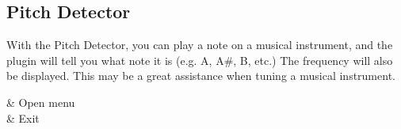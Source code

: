 
\subsection{Pitch Detector}

With the Pitch Detector, you can play a note on a musical instrument,
and the plugin will tell you what note it is (e.g. A, A\#, B, etc.) The
frequency will also be displayed. This may be a great assistance when
tuning a musical instrument.

\begin{btnmap}
    \PluginCancel
    & Open menu\\

    \PluginExit
    & Exit\\
\end{btnmap}
